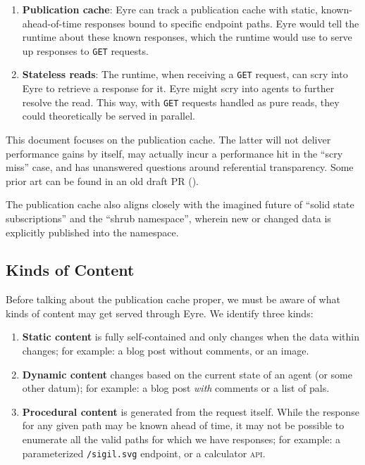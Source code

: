 \documentclass[twoside]{article}
\begin{document}
\begin{enumerate}
  \item  {\bf Publication cache}: Eyre can track a publication cache with static, known-ahead-of-time responses bound to specific endpoint paths. Eyre would tell the runtime about these known responses, which the runtime would use to serve up responses to \texttt{GET} requests.
  \item  {\bf Stateless reads}: The runtime, when receiving a \texttt{GET} request, can scry into Eyre to retrieve a response for it. Eyre might scry into agents to further resolve the read. This way, with \texttt{GET} requests handled as pure reads, they could theoretically be served in parallel.
\end{enumerate}

This document focuses on the publication cache. The latter will not deliver performance gains by itself, may actually incur a performance hit in the ``scry miss'' case, and has unanswered questions around referential transparency. Some prior art can be found in an old draft PR ().

The publication cache also aligns closely with the imagined future of ``solid state subscriptions'' and the ``shrub namespace'', wherein new or changed data is explicitly published into the namespace.

\subsection{Kinds of Content}

Before talking about the publication cache proper, we must be aware of what kinds of content may get served through Eyre. We identify three kinds:

\begin{enumerate}
  \item  {\bf Static content} is fully self-contained and only changes when the data within changes; for example: a blog post without comments, or an image.
  \item  {\bf Dynamic content} changes based on the current state of an agent (or some other datum); for example: a blog post \emph{with} comments or a list of pals.
  \item  {\bf Procedural content} is generated from the request itself. While the response for any given path may be known ahead of time, it may not be possible to enumerate all the valid paths for which we have responses; for example: a parameterized \lstinline[style=inlinecode]{/sigil.svg} endpoint, or a calculator \textsc{api}.
\end{enumerate}
\end{document}

